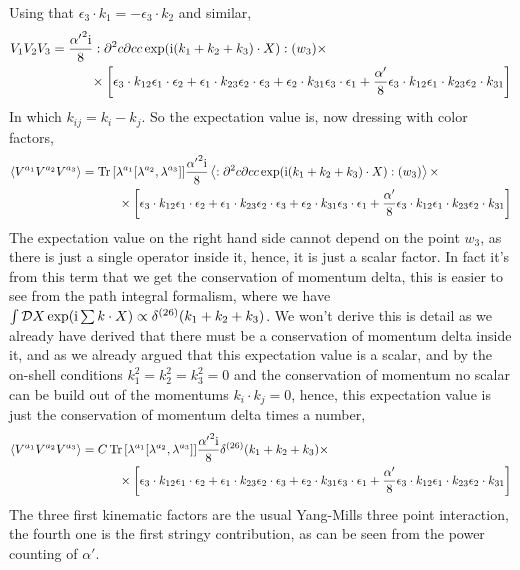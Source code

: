 Using that $\epsilon_3\cdot k_1=-\epsilon_3 \cdot k_2$ and similar,
\begin{align*}
    V_1V_2V_3&=\frac{{\alpha'}^2\textnormal{i}}{8}:{\partial^2 c\partial cc\exp(\textnormal{i}(k_1+k_2+ k_3)\cdot X)}:(w_3)\times\\
    &\quad\quad\quad\times\left[\epsilon_3\cdot k_{12}\epsilon_{1}\cdot\epsilon_{2}+\epsilon_{1}\cdot k_{23}\epsilon_{2}\cdot \epsilon_3+\epsilon_{2}\cdot k_{31}\epsilon_3\cdot\epsilon_{1}+\frac{\alpha'}{8}\epsilon_3\cdot k_{12}\epsilon_1\cdot k_{23}\epsilon_2\cdot k_{31}\right]\\
\end{align*}
In which $k_{ij}=k_i-k_j$. So the expectation value is, now dressing with color factors,
\begin{align*}
    \expval{V^{a_1}V^{a_2}V^{a_3}}&=\Tr\qty[\lambda^{a_1}\comm{\lambda^{a_2}}{\lambda^{a_3}}]\frac{{\alpha'}^2\im}{8}\expval{\cnord{{\partial^2 c\partial cc\exp(\im(k_1+k_2+ k_3)\cdot X)}}(w_3)}\times\\
    &\quad\quad\quad\times\left[\epsilon_3\cdot k_{12}\epsilon_{1}\cdot\epsilon_{2}+\epsilon_{1}\cdot k_{23}\epsilon_{2}\cdot \epsilon_3+\epsilon_{2}\cdot k_{31}\epsilon_3\cdot\epsilon_{1}+\frac{\alpha'}{8}\epsilon_3\cdot k_{12}\epsilon_1\cdot k_{23}\epsilon_2\cdot k_{31}\right]\\
\end{align*}
The expectation value on the right hand side cannot depend on the point $w_3$, as there is just a single operator inside it, hence, 
it is just a scalar factor. In fact it's from this term that we get the conservation of momentum delta, 
this is easier to see from the path integral formalism, where we have $\int\mathcal D X\exp(\textnormal{i} \sum k\cdot X)\propto \delta^{\qty(26)}\qty(k_1+k_2+k_3)$. 
We won't derive this is detail as we already have derived that there must be a conservation of momentum delta inside it, and as we already 
argued that this expectation value is a scalar, and by the on-shell conditions $k_1^2=k_2^2=k_3^2=0$ and the conservation of momentum 
no scalar can be build out of the momentums $k_i\cdot k_j=0$, hence, this expectation value is just the conservation of momentum delta 
times a number,
\begin{align*}
    \expval{V^{a_1}V^{a_2}V^{a_3}}&=C\Tr\qty[\lambda^{a_1}\comm{\lambda^{a_2}}{\lambda^{a_3}}]\frac{{\alpha'}^2\im}{8}\delta^{\qty(26)}\qty(k_1+k_2+k_3)\times\\
    &\quad\quad\quad\times\left[\epsilon_3\cdot k_{12}\epsilon_{1}\cdot\epsilon_{2}+\epsilon_{1}\cdot k_{23}\epsilon_{2}\cdot \epsilon_3+\epsilon_{2}\cdot k_{31}\epsilon_3\cdot\epsilon_{1}+\frac{\alpha'}{8}\epsilon_3\cdot k_{12}\epsilon_1\cdot k_{23}\epsilon_2\cdot k_{31}\right]\\
\end{align*}
The three first kinematic factors are the usual Yang-Mills three point interaction, the fourth one is the first stringy contribution, 
as can be seen from the power counting of $\alpha'$.


